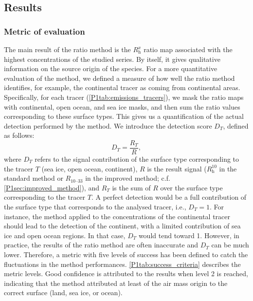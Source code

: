\subsection{Results}
   \label{P1sec:results}

    \subsubsection{Metric of evaluation}
        \label{P1sec:evaluation_metric}

        The main result of the ratio method is the $R_\text{h}^{x}$ ratio map associated with the highest concentrations of the studied series.
        By itself, it gives qualitative information on the source origin of the species.
       For a more quantitative evaluation of the method, we defined a measure of how well the ratio method identifies, for example, the continental tracer as coming from continental areas. Specifically, for each tracer (\cref{P1tab:emissions_tracers}),
        we mask the ratio maps with continental, open ocean, and sea ice masks, and then sum the ratio values corresponding to these surface types. This gives us a quantification of the actual detection performed by the method.
        We introduce the detection score $D_{T}$, defined as follows:
        \begin{equation}
            D_{T} = \frac{R_{T}}{R},
        \end{equation}
        where $D_{T}$
        refers to the signal contribution of the surface type corresponding to the tracer $T$ (sea ice, open ocean, continent), $R$ is the result signal ($R_\text{h}^{10}$ in the standard method or $R_\text{10--33}$ in the improved method; c.f. \cref{P1sec:improved_method}), and $R_{T}$ is the sum of $R$ over the surface type corresponding to the tracer $T$.
        A perfect detection would be a full contribution of the surface type that corresponds to the analysed tracer, i.e., $D_{T} = 1$.
        For instance, the method applied to the concentrations of the continental tracer should lead to the detection of the continent, with a limited contribution of sea ice and open ocean regions. In that case, $D_{T}$ would tend toward 1. However, in practice, the results of the ratio method are often inaccurate and $D_{T}$ can be much lower.
        Therefore, a metric with five levels of success has been defined to catch the fluctuations in the method performances.
        \cref{P1tab:success_criteria} describes the metric levels.
        Good confidence is attributed to the results when level 2 is reached, indicating that the method attributed at least  of the air mass origin to the correct surface (land, sea ice, or ocean). %

